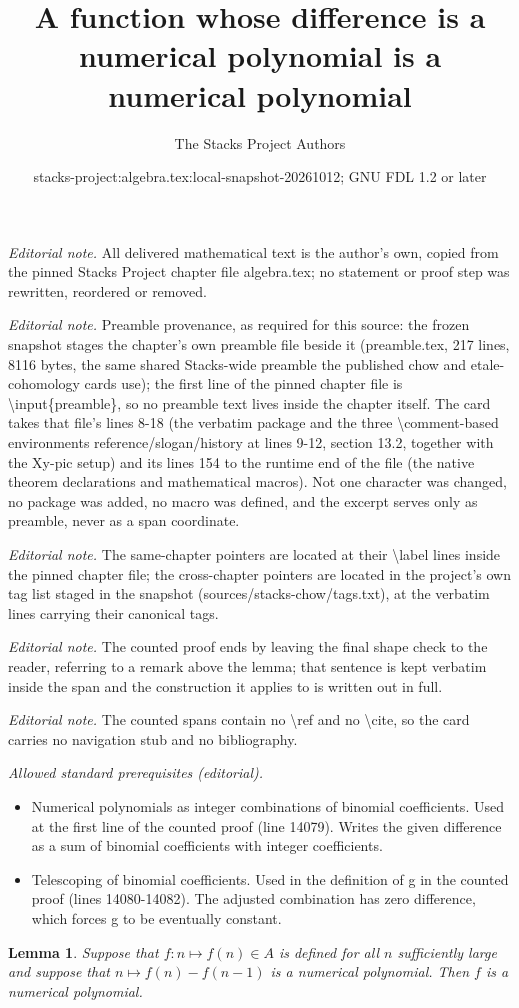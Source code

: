 \documentclass[10pt,a4paper]{amsart}
\title{A function whose difference is a numerical polynomial is a numerical polynomial}
\author{The Stacks Project Authors}
\date{stacks-project:algebra.tex:local-snapshot-20261012; GNU FDL 1.2 or later}
\theoremstyle{plain}
\newtheorem{lemma}[subsection]{Lemma}
\theoremstyle{definition}
\theoremstyle{remark}
\numberwithin{equation}{subsection}
\begin{document}
\maketitle
\noindent\textit{Editorial note.} All delivered mathematical text is the author's own, copied from the pinned Stacks Project chapter file algebra.tex; no statement or proof step was rewritten, reordered or removed.\par\medskip
\noindent\textit{Editorial note.} Preamble provenance, as required for this source: the frozen snapshot stages the chapter's own preamble file beside it (preamble.tex, 217 lines, 8116 bytes, the same shared Stacks-wide preamble the published chow and etale-cohomology cards use); the first line of the pinned chapter file is \textbackslash{}input\{preamble\}, so no preamble text lives inside the chapter itself. The card takes that file's lines 8-18 (the verbatim package and the three \textbackslash{}comment-based environments reference/slogan/history at lines 9-12, section 13.2, together with the Xy-pic setup) and its lines 154 to the runtime end of the file (the native theorem declarations and mathematical macros). Not one character was changed, no package was added, no macro was defined, and the excerpt serves only as preamble, never as a span coordinate.\par\medskip
\noindent\textit{Editorial note.} The same-chapter pointers are located at their \textbackslash{}label lines inside the pinned chapter file; the cross-chapter pointers are located in the project's own tag list staged in the snapshot (sources/stacks-chow/tags.txt), at the verbatim lines carrying their canonical tags.\par\medskip
\noindent\textit{Editorial note.} The counted proof ends by leaving the final shape check to the reader, referring to a remark above the lemma; that sentence is kept verbatim inside the span and the construction it applies to is written out in full.\par\medskip
\noindent\textit{Editorial note.} The counted spans contain no \textbackslash{}ref and no \textbackslash{}cite, so the card carries no navigation stub and no bibliography.\par\medskip
\noindent\textit{Allowed standard prerequisites (editorial).}\begin{itemize}
\item Numerical polynomials as integer combinations of binomial coefficients. Used at the first line of the counted proof (line 14079). Writes the given difference as a sum of binomial coefficients with integer coefficients.
\item Telescoping of binomial coefficients. Used in the definition of g in the counted proof (lines 14080-14082). The adjusted combination has zero difference, which forces g to be eventually constant.
\end{itemize}\medskip
\begin{lemma}
\label{lemma-numerical-polynomial}
Suppose that $f: n \mapsto f(n) \in A$
is defined for all $n$ sufficiently large
and suppose that $n \mapsto f(n) - f(n-1)$
is a numerical polynomial. Then $f$ is a
numerical polynomial.
\end{lemma}
\end{document}

